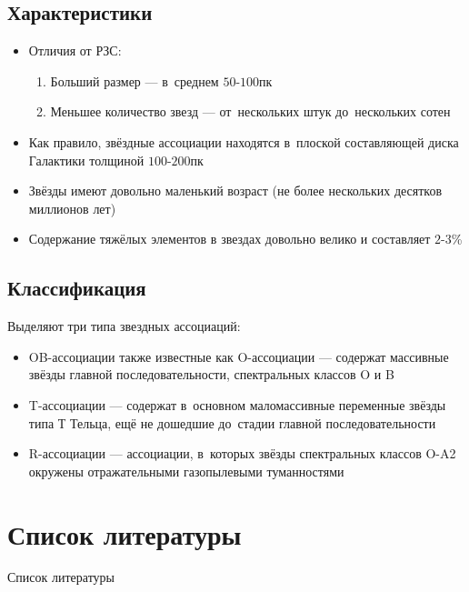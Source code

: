\documentclass{beamer}
\begin{document}
    \subsection{Характеристики}
    \begin{frame}
        \begin{itemize}
            \item Отличия от РЗС:
            \begin{enumerate}
                \item Больший размер --- в~среднем $50$-$100$пк
                \item Меньшее количество звезд --- от~нескольких штук до~нескольких сотен
            \end{enumerate}
            \item Как правило, звёздные ассоциации находятся в~плоской составляющей диска Галактики толщиной $100$-$200$пк
            \item Звёзды имеют довольно маленький возраст (не более нескольких десятков миллионов лет)
            \item Содержание тяжёлых элементов в звездах довольно велико и составляет $2$-$3$\%
        \end{itemize}
    \end{frame}
    \subsection{Классификация}
    \begin{frame}
        Выделяют три типа звездных ассоциаций:
        \begin{itemize}
            \item OB-ассоциации также известные как O-ассоциации --- содержат массивные звёзды главной последовательности, 
            спектральных классов O и B
            \item T-ассоциации --- содержат в~основном маломассивные переменные звёзды типа Т Тельца, 
            ещё не дошедшие до~стадии главной последовательности
            \item R-ассоциации --- ассоциации, в~которых звёзды спектральных классов O-A2 окружены отражательными газопылевыми туманностями
        \end{itemize}
    \end{frame}

    \section{Список литературы}
    \begin{frame}[t, allowframebreaks]{Список литературы}
        
        
    \end{frame}
\end{document}
